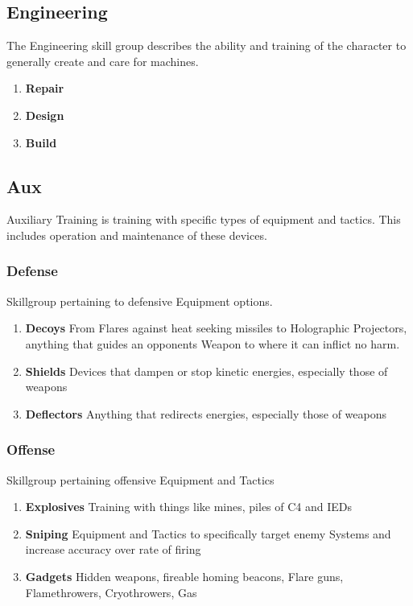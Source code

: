 \subsection{Engineering}\label{subsec:engineering}
The Engineering skill group describes the ability and training of the 
character to generally create and care for machines.
\begin{enumerate}[label= -]
    \item \textbf{Repair} 
    \item \textbf{Design} 
    \item \textbf{Build} 
\end{enumerate}
\subsection{Aux}\label{subsec:aux}
Auxiliary Training is training with specific types of equipment and tactics.
This includes operation and maintenance of these devices.
\subsubsection{Defense}\label{subsubsec:defense}
Skillgroup pertaining to defensive Equipment options.
\begin{enumerate}[label= -]
    \item \textbf{Decoys} From Flares against heat seeking missiles to Holographic Projectors, anything that guides
     an opponents Weapon to where it can inflict no harm.
    \item \textbf{Shields} Devices that dampen or stop kinetic energies, especially those of weapons
    \item \textbf{Deflectors} Anything that redirects energies, especially those of weapons
\end{enumerate}
\subsubsection{Offense}
Skillgroup pertaining offensive Equipment and Tactics
\begin{enumerate}[label= -]
    \item \textbf{Explosives} Training with things like mines, piles of C4 and IEDs
    \item \textbf{Sniping} Equipment and Tactics to specifically target enemy Systems and increase accuracy
    over rate of firing
    \item \textbf{Gadgets} Hidden weapons, fireable homing beacons, Flare guns, Flamethrowers, Cryothrowers, Gas
\end{enumerate}
